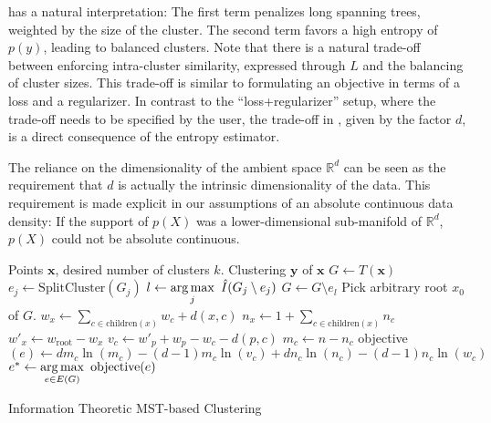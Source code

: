  has a natural interpretation: The first term
penalizes long spanning trees, weighted by the size of the cluster. The second
term favors a high entropy of $p(y)$, leading to balanced clusters. Note that
there is a natural trade-off between enforcing intra-cluster similarity,
expressed through $L$ and the balancing of cluster sizes. This trade-off is
similar to formulating an objective in terms of a loss and a regularizer. In
contrast to the ``loss+regularizer'' setup, where the trade-off needs to be
specified by the user, the trade-off in , given by
the factor $d$, is a direct consequence of the entropy estimator.

The reliance on the dimensionality of the ambient space $\mathbb{R}^d$ can be
seen as the requirement that $d$ is actually the intrinsic dimensionality of
the data.
This requirement is made explicit in our assumptions of an absolute continuous
data density: If the support of $p(X)$ was a lower-dimensional sub-manifold of
$\mathbb{R}^d$, $p(X)$ could not be absolute continuous.

\begin{algorithm}[t]
\begin{algorithmic}\label{overall}
    \Require Points $\mathbf{x}$, desired number of clusters $k$.
    \Ensure Clustering $\mathbf{y}$ of $\mathbf{x}$
    \State $G \leftarrow T(\mathbf{x})$
            \State $e_j \leftarrow \text{SplitCluster}(G_j)$
        \EndFor
        \State $l \leftarrow \displaystyle \operatorname*{arg\,max}_j\  \hat{I}(G_j \setminus e_j)$
        \State $G \leftarrow G \setminus e_l$
    \EndFor
    \Statex
        \State Pick arbitrary root $x_0$ of $G$.
            \State $w_x \leftarrow \displaystyle \sum_{c \in \text{children}(x)} w_c + d(x, c)$
            \State $n_x \leftarrow \displaystyle 1 + \sum_{c \in \text{children}(x)} n_c$
        \EndFor
        \State $w'_x \leftarrow w_{\text{root}} - w_x$
        \EndFor
            \State $v_c \leftarrow w'_p + w_p - w_c - d(p,c)$
            \State $m_c \leftarrow n - n_c$
            \State objective$(e) \leftarrow d m_c \ln(m_c) - (d-1) m_c \ln(v_c) + d n_c \ln(n_c) - (d-1) n_c \ln (w_c)$
        \EndFor
        \State $e^* \leftarrow \displaystyle \operatorname*{arg\,max}_{e \in E(G)} \ \text{objective}(e)$
        
    \EndFunction
\end{algorithmic}
\caption{Information Theoretic MST-based Clustering}

\end{algorithm}


